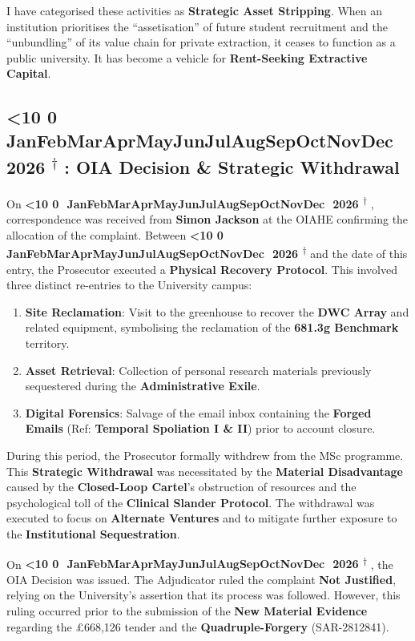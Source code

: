 \documentclass{EMBASSY}
\DeclareRobustCommand{\gmt}[3]{%
    \texorpdfstring{%
        {\color{DateGold}\textbf{%
            \ifnum#1<10 0\fi#1\,\textperiodcentered\,%
            \ifcase#2\or Jan\or Feb\or Mar\or Apr\or May\or Jun\or Jul\or Aug\or Sep\or Oct\or Nov\or Dec\fi
            \,\textperiodcentered\,20#3%
            \textsuperscript{$\dagger$}%
        }}%
    }{%
        (#1/#2/#3)%
    }%
}
\begin{document}
\noindent I have categorised these activities as \textbf{Strategic Asset Stripping}. When an institution prioritises the ``assetisation'' of future student recruitment and the ``unbundling'' of its value chain for private extraction, it ceases to function as a public university. It has become a vehicle for \textbf{Rent-Seeking Extractive Capital}.

\subsection{\gmt{2}{9}{26}: OIA Decision \& Strategic Withdrawal}
On \gmt{20}{8}{26}, correspondence was received from \textbf{Simon Jackson} at the OIAHE confirming the allocation of the complaint. Between \gmt{30}{4}{26} and the date of this entry, the Prosecutor executed a \textbf{Physical Recovery Protocol}. This involved three distinct re-entries to the University campus:

\begin{enumerate}
    \item \textbf{Site Reclamation}: Visit to the greenhouse to recover the \textbf{DWC Array} and related equipment, symbolising the reclamation of the \textbf{681.3g Benchmark} territory.
    \item \textbf{Asset Retrieval}: Collection of personal research materials previously sequestered during the \textbf{Administrative Exile}.
    \item \textbf{Digital Forensics}: Salvage of the email inbox containing the \textbf{Forged Emails} (Ref: \textbf{Temporal Spoliation I \& II}) prior to account closure.
\end{enumerate}

During this period, the Prosecutor formally withdrew from the MSc programme. This \textbf{Strategic Withdrawal} was necessitated by the \textbf{Material Disadvantage} caused by the \textbf{Closed-Loop Cartel}’s obstruction of resources and the psychological toll of the \textbf{Clinical Slander Protocol}. The withdrawal was executed to focus on \textbf{Alternate Ventures} and to mitigate further exposure to the \textbf{Institutional Sequestration}.

On \gmt{02}{9}{26}, the OIA Decision was issued. The Adjudicator ruled the complaint \textbf{Not Justified}, relying on the University’s assertion that its process was followed. However, this ruling occurred prior to the submission of the \textbf{New Material Evidence} regarding the \pounds668,126 tender and the \textbf{Quadruple-Forgery} (SAR-2812841).
\end{document}
